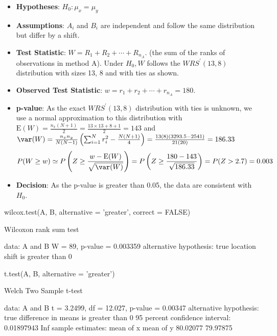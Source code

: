 \documentclass[a4paper]{article}
\begin{document}
\begin{itemize}
	\item \textbf{Hypotheses}: \( H_0: \mu_x = \mu_y \)
	\item \textbf{Assumptions}: \( A_i \) and \( B_i \) are independent and follow the same distribution but differ by a shift.
	\item \textbf{Test Statistic}: \( W = R_1 + R_2 + \dotsb + R_{n_A} \). (the sum of the ranks of observations in method A). Under \( H_0, W \) follows the \( WRS^\prime (13,8) \) distribution with sizes 13, 8 and with ties as shown.
	\item \textbf{Observed Test Statistic}: \( w = r_1 + r_2 + \dotsb + r_{n_A} = 180 \).
	\item \textbf{p-value}: As the exact \( WRS^\prime (13,8) \) distribution with ties is unknown, we use a normal approximation to this distribution with \( \mathrm{E}(W) = \frac{n_x (N+1)}{2} = \frac{13\times 13 + 8 + 1}{2} = 143 \) and \( \var(W) = \frac{n_x n_y}{N(N-1)} \left( \sum_{i=1}^{N} r^{2}_{i} - \frac{N(N+1)}{4} \right) = \frac{13 (8) (3293.5-2541)}{21(20)} = 186.33 \)
	\[
		P(W \geq w) \simeq P \left( Z \geq \frac{w-\mathrm{E}(W)}{\sqrt{\var(W)}} \right) = P \left( Z \geq \frac{180 - 143}{\sqrt{186.33}} \right) = P(Z > 2.7) = 0.003
	\]
	\item \textbf{Decision}: As the p-value is greater than 0.05, the data are consistent with \( H_0 \).
\end{itemize}
\begin{Schunk}
\begin{Sinput}
wilcox.test(A, B, alternative = 'greater', correct = FALSE)
\end{Sinput}
\begin{Soutput}

	Wilcoxon rank sum test

data:  A and B
W = 89, p-value = 0.003359
alternative hypothesis: true location shift is greater than 0
\end{Soutput}
\begin{Sinput}
t.test(A, B, alternative = 'greater')
\end{Sinput}
\begin{Soutput}

	Welch Two Sample t-test

data:  A and B
t = 3.2499, df = 12.027, p-value = 0.00347
alternative hypothesis: true difference in means is greater than 0
95 percent confidence interval:
 0.01897943        Inf
sample estimates:
mean of x mean of y 
 80.02077  79.97875 
\end{Soutput}
\end{Schunk}
\end{document}
